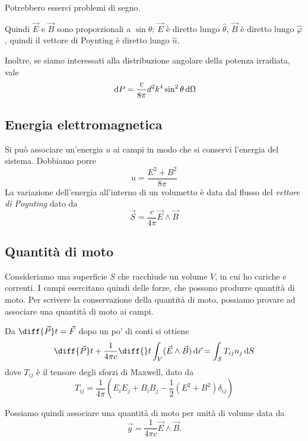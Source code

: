 \documentclass[a4paper,10pt,oneside]{math_article}
\renewcommand{\phi}{\varphi }
\begin{document}
			Potrebbero esserci problemi di segno.

			Quindi $\vec E$ e $\vec B$ sono proporzionali a $\sin \theta$; $\vec E$ è diretto lungo $\hat \theta$, $\vec B$ è diretto lungo $\hat \phi$, quindi il vettore di Poynting è diretto lungo $\hat n$.
			
			Inoltre, se siamo interessati alla distribuzione angolare della potenza irradiata, vale
			\[
			 \, \textrm{d} P = \frac c{8\pi} d^2k^4\sin^2\theta  \, \textrm{d}\Omega
			\]
		\subsection{Energia elettromagnetica}
			Si può associare un'energia $u$ ai campi in modo che si conservi l'energia del sistema. Dobbiamo porre
			\begin{equation}
				u = \frac {E^2+B^2}{8\pi}
			\end{equation}
			La variazione dell'energia all'interno di un volumetto è data dal flusso del \emph{vettore di Poynting} dato da 
			\begin{equation}
				\vec S=\frac{c}{4\pi} \vec E \wedge \vec B
			\end{equation}


			
		\subsection{Quantità di moto}
			Consideriamo una superficie $S$ che racchiude un volume $V$, in cui ho cariche e correnti. I campi esercitano quindi delle forze, che possono produrre quantità di moto. Per scrivere la conservazione della quantità di moto, possiamo provare ad associare una quantità di moto ai campi.
			
			Da $\diff {\vec P}t = \vec F$  dopo un po' di conti si ottiene 
			\begin{equation}
					\diff {\vec P}t + \frac1{4\pi c}\diff{}t \int_V (\vec E \wedge \vec B) \de\vec r = \int_S T_{ij}n_j \de S
			\end{equation}
			dove $T_{ij}$ è il tensore degli sforzi di Maxwell, dato da 
			\begin{equation}
				T_{ij} = \frac1{4\pi} \left(E_iE_j+B_iB_j - \frac12 (E^2 + B^2) \delta_{ij}\right)
			\end{equation}
			
			Possiamo quindi associare una quantità di moto per unità di volume data da 
			\begin{equation}
				\vec g = \frac1{4	\pi c} \vec E \wedge \vec B.
			\end{equation}
			
\end{document}
